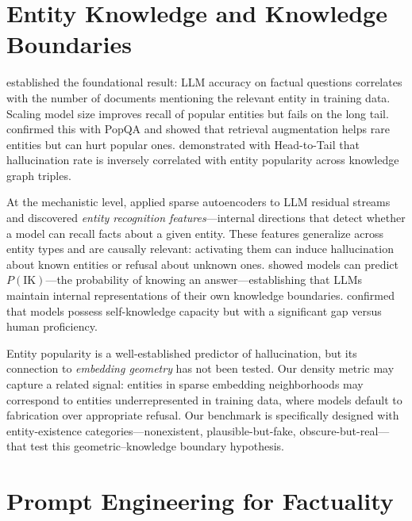 \section{Entity Knowledge and Knowledge Boundaries}
\label{sec:lit-entity}

\citet{kandpal2023large} established the foundational result: LLM accuracy on factual questions correlates with the number of documents mentioning the relevant entity in training data.  Scaling model size improves recall of popular entities but fails on the long tail.  \citet{mallen2023when} confirmed this with PopQA and showed that retrieval augmentation helps rare entities but can hurt popular ones.  \citet{sun2024entity} demonstrated with Head-to-Tail that hallucination rate is inversely correlated with entity popularity across knowledge graph triples.

At the mechanistic level, \citet{ferrando2024knowledge} applied sparse autoencoders to LLM residual streams and discovered \emph{entity recognition features}---internal directions that detect whether a model can recall facts about a given entity.  These features generalize across entity types and are causally relevant: activating them can induce hallucination about known entities or refusal about unknown ones.  \citet{kadavath2022language} showed models can predict $P(\text{IK})$---the probability of knowing an answer---establishing that LLMs maintain internal representations of their own knowledge boundaries.  \citet{yin2023large} confirmed that models possess self-knowledge capacity but with a significant gap versus human proficiency.

Entity popularity is a well-established predictor of hallucination, but its connection to \emph{embedding geometry} has not been tested.  Our density metric may capture a related signal: entities in sparse embedding neighborhoods may correspond to entities underrepresented in training data, where models default to fabrication over appropriate refusal.  Our benchmark is specifically designed with entity-existence categories---nonexistent, plausible-but-fake, obscure-but-real---that test this geometric--knowledge boundary hypothesis.


\section{Prompt Engineering for Factuality}
\label{sec:lit-prompt}

